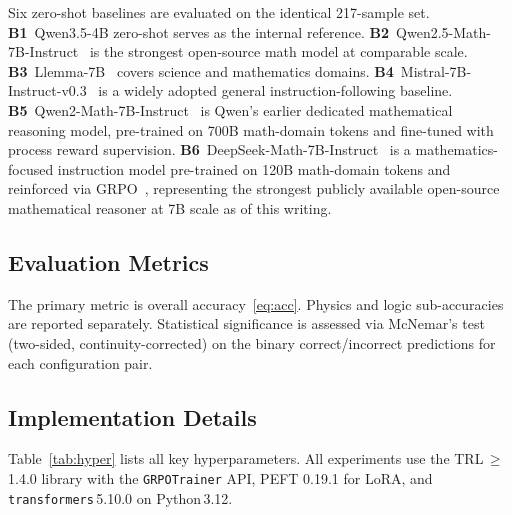 \documentclass{ieeeaccess}
\newcommand{\basemodelname}{Qwen3.5-4B}
\begin{document}
Six zero-shot baselines are evaluated on the identical 217-sample set.
\textbf{B1}~\basemodelname{} zero-shot serves as the internal reference.
\textbf{B2}~Qwen2.5-Math-7B-Instruct~\cite{b5} is the strongest
open-source math model at comparable scale.
\textbf{B3}~Llemma-7B~\cite{b6} covers science and mathematics domains.
\textbf{B4}~Mistral-7B-Instruct-v0.3~\cite{b26} is a widely adopted
general instruction-following baseline.
\textbf{B5}~Qwen2-Math-7B-Instruct~\cite{b31} is Qwen's earlier
dedicated mathematical reasoning model, pre-trained on 700B math-domain
tokens and fine-tuned with process reward supervision.
\textbf{B6}~DeepSeek-Math-7B-Instruct~\cite{b30} is a mathematics-focused
instruction model pre-trained on 120B math-domain tokens and reinforced via
GRPO~\cite{b4}, representing the strongest publicly available open-source
mathematical reasoner at 7B scale as of this writing.

\subsection{Evaluation Metrics}

The primary metric is overall accuracy~\eqref{eq:acc}.
Physics and logic sub-accuracies are reported separately.
Statistical significance is assessed via McNemar's test~\cite{b25}
(two-sided, continuity-corrected) on the binary correct/incorrect
predictions for each configuration pair.

\subsection{Implementation Details}

Table~\ref{tab:hyper} lists all key hyperparameters.
All experiments use the TRL\,$\geq$1.4.0 library with the
\texttt{GRPOTrainer} API, PEFT 0.19.1 for LoRA, and
\texttt{transformers}\,5.10.0 on Python\,3.12.
\end{document}
